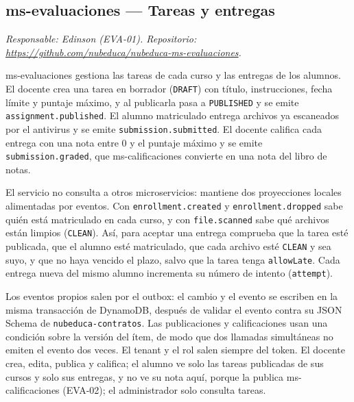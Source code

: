 \subsection{ms-evaluaciones --- Tareas y entregas}
\label{sec:ms-evaluaciones}
\textit{Responsable: Edinson (EVA-01). Repositorio: \url{https://github.com/nubeduca/nubeduca-ms-evaluaciones}.}

ms-evaluaciones gestiona las tareas de cada curso y las entregas de los alumnos. El docente crea una tarea en borrador (\texttt{DRAFT}) con título, instrucciones, fecha límite y puntaje máximo, y al publicarla pasa a \texttt{PUBLISHED} y se emite \texttt{assignment.published}. El alumno matriculado entrega archivos ya escaneados por el antivirus y se emite \texttt{submission.submitted}. El docente califica cada entrega con una nota entre 0 y el puntaje máximo y se emite \texttt{submission.graded}, que ms-calificaciones convierte en una nota del libro de notas.

El servicio no consulta a otros microservicios: mantiene dos proyecciones locales alimentadas por eventos. Con \texttt{enrollment.created} y \texttt{enrollment.dropped} sabe quién está matriculado en cada curso, y con \texttt{file.scanned} sabe qué archivos están limpios (\texttt{CLEAN}). Así, para aceptar una entrega comprueba que la tarea esté publicada, que el alumno esté matriculado, que cada archivo esté \texttt{CLEAN} y sea suyo, y que no haya vencido el plazo, salvo que la tarea tenga \texttt{allowLate}. Cada entrega nueva del mismo alumno incrementa su número de intento (\texttt{attempt}).

Los eventos propios salen por el outbox: el cambio y el evento se escriben en la misma transacción de DynamoDB, después de validar el evento contra su JSON Schema de \texttt{nubeduca-contratos}. Las publicaciones y calificaciones usan una condición sobre la versión del ítem, de modo que dos llamadas simultáneas no emiten el evento dos veces. El tenant y el rol salen siempre del token. El docente crea, edita, publica y califica; el alumno ve solo las tareas publicadas de sus cursos y solo sus entregas, y no ve su nota aquí, porque la publica ms-calificaciones (EVA-02); el administrador solo consulta tareas.

